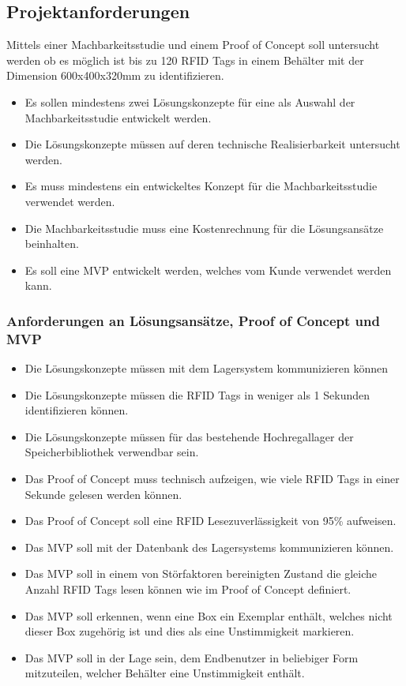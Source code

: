 \subsection{Projektanforderungen}
Mittels einer Machbarkeitsstudie und einem Proof of Concept soll untersucht werden ob es möglich ist bis zu 120 \gls{RFID} Tags in einem Behälter mit der Dimension 600x400x320mm zu identifizieren.

\begin{itemize}
	\item Es sollen mindestens zwei Lösungskonzepte für eine als Auswahl der Machbarkeitsstudie entwickelt werden.
	\item Die Lösungskonzepte müssen auf deren technische Realisierbarkeit untersucht werden.
	\item Es muss mindestens ein entwickeltes Konzept für die Machbarkeitsstudie verwendet werden.
	\item Die Machbarkeitsstudie muss eine Kostenrechnung für die Lösungsansätze beinhalten.
	\item Es soll eine MVP entwickelt werden, welches vom Kunde verwendet werden kann.
\end{itemize}

\subsubsection{Anforderungen an Lösungsansätze, Proof of Concept und MVP}

\begin{itemize}
	\item Die Lösungskonzepte müssen mit dem Lagersystem kommunizieren können
	\item Die Lösungskonzepte müssen die \gls{RFID} Tags in weniger als 1 Sekunden identifizieren können.
	\item Die Lösungskonzepte müssen für das bestehende Hochregallager der Speicherbibliothek verwendbar sein.
	
	\item Das Proof of Concept muss technisch aufzeigen, wie viele \gls{RFID} Tags in einer Sekunde gelesen werden können.
	\item Das Proof of Concept soll eine \gls{RFID} Lesezuverlässigkeit von 95\% aufweisen.
	
	\item Das MVP soll mit der Datenbank des Lagersystems kommunizieren können.
	\item Das MVP soll in einem von Störfaktoren bereinigten Zustand die gleiche Anzahl \gls{RFID} Tags lesen können wie im Proof of Concept definiert.
	\item Das MVP soll erkennen, wenn eine Box ein Exemplar enthält, welches nicht dieser Box zugehörig ist und dies als eine Unstimmigkeit markieren.
	\item Das MVP soll in der Lage sein, dem Endbenutzer in beliebiger Form mitzuteilen, welcher Behälter eine Unstimmigkeit enthält.
\end{itemize}

